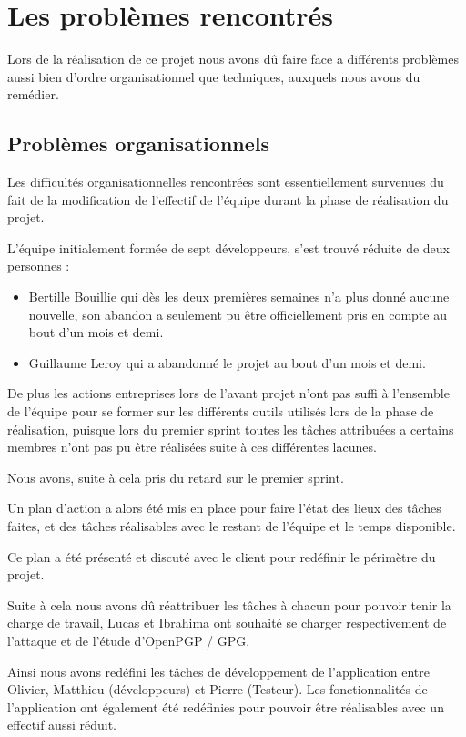 \documentclass{../res/univ-projet}
\begin{document}
\section{Les problèmes rencontrés}

  Lors de la réalisation de ce projet nous avons dû faire face a
  différents problèmes aussi bien d'ordre organisationnel que techniques,
  auxquels nous avons du remédier.

  \subsection{Problèmes organisationnels}

    Les difficultés organisationnelles rencontrées sont essentiellement
    survenues du fait de la modification de l'effectif de l'équipe durant la
    phase de réalisation du projet. 

    L'équipe initialement formée de sept développeurs,
    s'est trouvé réduite de deux personnes :
    \begin{itemize}
      \item Bertille Bouillie qui dès les deux premières semaines n'a plus donné
      aucune nouvelle, son abandon a seulement pu être officiellement pris en compte au bout d'un mois et demi.
      \item Guillaume Leroy qui a abandonné le projet au bout d'un mois et demi.
    \end{itemize}
    De plus les actions entreprises lors de l'avant projet n'ont pas suffi à l'ensemble de l'équipe 
    pour se former sur les différents outils utilisés lors de la phase de réalisation,
    puisque lors du premier sprint toutes les tâches attribuées a certains membres n'ont pas pu être
    réalisées suite à ces différentes lacunes.

    Nous avons, suite à cela pris du retard sur le premier sprint.

    Un plan d'action a alors été mis en place pour faire l'état des lieux des tâches
    faites, et des tâches réalisables avec le restant de l'équipe et le temps disponible.

    Ce plan a été présenté et discuté avec le client pour redéfinir le périmètre du projet.

    Suite à cela nous avons dû réattribuer les tâches à chacun pour pouvoir tenir la charge de travail,
    Lucas et Ibrahima ont souhaité se charger respectivement de l'attaque et de l'étude d'OpenPGP / GPG.

    Ainsi nous avons redéfini les tâches de développement de l'application
    entre Olivier, Matthieu (développeurs) et Pierre (Testeur).
    Les fonctionnalités de l'application ont également été redéfinies pour pouvoir être réalisables avec un effectif
    aussi réduit.
\end{document}
